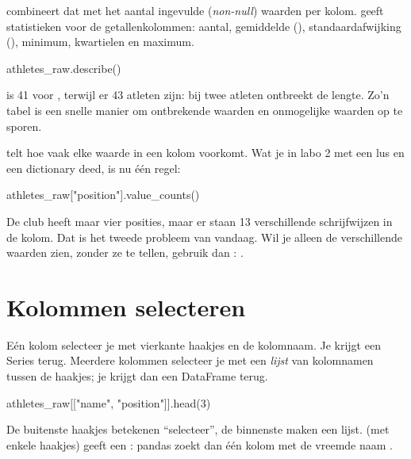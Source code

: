 \documentclass[11pt,a4paper]{article}
\begin{document}
\textbf{} combineert dat met het aantal ingevulde
(\emph{non-null}) waarden per kolom. \textbf{} geeft
statistieken voor de getallenkolommen: aantal, gemiddelde (),
standaardafwijking (), minimum, kwartielen en maximum.

\begin{python}
athletes_raw.describe()
\end{python}

 is 41 voor , terwijl er 43 atleten zijn:
bij twee atleten ontbreekt de lengte. Zo'n tabel is een snelle manier om
ontbrekende waarden en onmogelijke waarden op te sporen.

\textbf{} telt hoe vaak elke waarde in een kolom
voorkomt. Wat je in labo 2 met een lus en een dictionary deed, is nu één
regel:

\begin{python}
athletes_raw["position"].value_counts()
\end{python}

De club heeft maar vier posities, maar er staan 13 verschillende
schrijfwijzen in de kolom. Dat is het tweede probleem van vandaag. Wil je alleen
de verschillende waarden zien, zonder ze te tellen, gebruik dan
: .

\section{Kolommen selecteren}

Eén kolom selecteer je met vierkante haakjes en de kolomnaam. Je krijgt
een Series terug. Meerdere kolommen selecteer je met een \emph{lijst} van
kolomnamen tussen de haakjes; je krijgt dan een DataFrame terug.

\begin{python}
athletes_raw[["name", "position"]].head(3)
\end{python}

\begin{opgelet}
De buitenste haakjes betekenen ``selecteer'', de binnenste maken een
lijst.  (met enkele haakjes)
geeft een : pandas zoekt dan één kolom met de vreemde naam
.
\end{opgelet}

\end{document}
